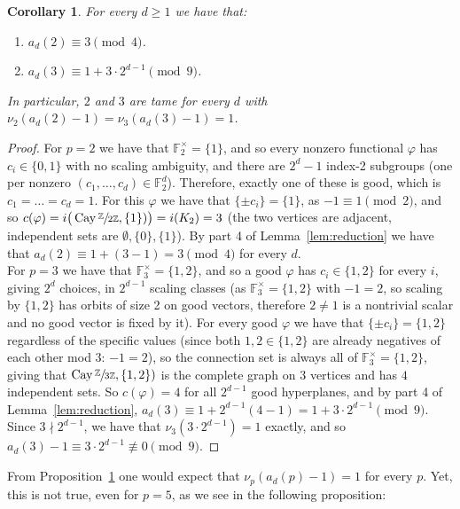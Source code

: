 \documentclass{article}
\theoremstyle{plain}
\newtheorem{corollary}[theorem]{Corollary}
\theoremstyle{definition}
\theoremstyle{remark}
\newcommand{\Z}{\mathbb{Z}}
\newcommand{\F}{\mathbb{F}}
\newcommand{\quot}[2]{\sfrac{#1}{#2}}
\DeclareMathOperator{\Cay}{Cay}
\begin{document}
\begin{corollary}\label{thm:p2}
For every $d\ge1$ we have that:
\begin{enumerate}
    \item $a_d(2)\equiv3\pmod4$.
    \item $a_d(3)\equiv1+3\cdot2^{d-1}\pmod9$.
\end{enumerate}
In particular, $2$ and $3$ are tame for every $d$ with $\nu_2(a_d(2)-1)=\nu_3(a_d(3)-1)=1$.
\end{corollary}
\begin{proof}
For $p=2$ we have that $\F_2^\times=\{1\}$, and so every nonzero functional $\varphi$ has $c_i\in\{0,1\}$ with no scaling ambiguity, and there are $2^d-1$ index-2 subgroups (one per nonzero $(c_1,\dots,c_d)\in\F_2^d$). Therefore, exactly one of these is good, which is  $c_1=\dots=c_d=1$. For this $\varphi$ we have that $\{\pm c_i\}=\{1\}$, as $-1\equiv1\pmod2$, and so $c(\varphi)=i\big(\Cay\quot\Z{2\Z},\{1\})\big)=i(K_2)=3$ (the two vertices are adjacent, independent sets are $\emptyset,\{0\},\{1\}$). By part 4 of Lemma~\ref{lem:reduction} we have that $a_d(2)\equiv1+(3-1)=3\pmod4$ for every $d$.\\

For $p=3$ we have that $\F_3^\times=\{1,2\}$, and so a good $\varphi$ has $c_i\in\{1,2\}$ for every $i$, giving $2^d$ choices, in $2^{d-1}$ scaling classes (as $\F_3^\times =\{1,2\}$ with $-1=2$, so scaling by $\{1,2\}$ has orbits of size 2 on good vectors, therefore $2\ne1$ is a nontrivial scalar and no good vector is fixed by it). For every good $\varphi$ we have that $\{\pm c_i\}=\{1,2\}$ regardless of the specific values (since both $1,2\in\{1,2\}$ are already negatives of each other mod 3: $-1=2$), so the connection set is always all of $\F_3^\times=\{1,2\}$, giving that $\Cay\quot\Z{3\Z},\{1,2\})$ is the complete graph on 3 vertices and has $4$ independent sets. So $c(\varphi)=4$ for all $2^{d-1}$ good hyperplanes, and by part 4 of Lemma~\ref{lem:reduction}, $a_d(3)\equiv1+2^{d-1}(4-1)=1+3\cdot2^{d-1}\pmod9$. Since $3\nmid2^{d-1}$, we have that $\nu_3(3\cdot2^{d-1})=1$ exactly, and so $a_d(3)-1\equiv3\cdot2^{d-1}\not\equiv0\pmod9$.
\end{proof}

From Proposition~\ref{thm:p2} one would expect that $\nu_p(a_d(p)-1)=1$ for every $p$. Yet, this is not true, even for $p=5$, as we see in the following proposition:
\end{document}
